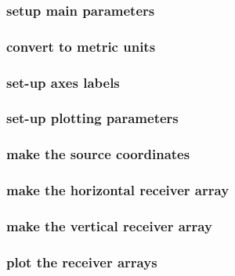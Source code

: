 \begin{frame} \frametitle{setup main parameters}

\end{frame}
\cwpnote{}

\begin{frame} \frametitle{convert to metric units}

\end{frame}
\cwpnote{}

\begin{frame} \frametitle{set-up axes labels}

\end{frame}
\cwpnote{}

\begin{frame} \frametitle{set-up plotting parameters}

\end{frame}
\cwpnote{}

\begin{frame} \frametitle{make the source coordinates}

\end{frame}
\cwpnote{}

\begin{frame} \frametitle{make the horizontal receiver array}

\end{frame}
\cwpnote{}

\begin{frame} \frametitle{make the vertical receiver array}

\end{frame}
\cwpnote{}

\begin{frame} \frametitle{plot the receiver arrays}

\end{frame}
\cwpnote{}

\begin{frame}  \end{frame}

